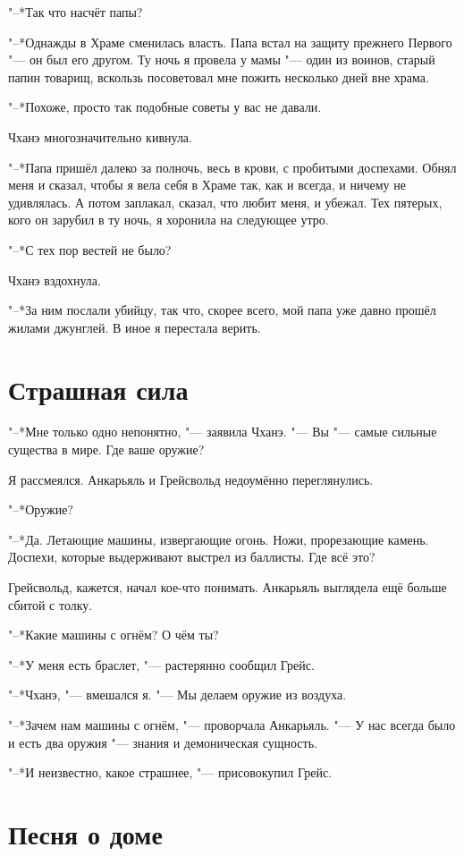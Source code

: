 \documentclass[a4paper,10pt]{book}
\begin{document}
"--*Так что насчёт папы?

"--*Однажды в Храме сменилась власть. Папа встал на защиту прежнего Первого 
"--- он был его другом. Ту ночь я провела у мамы "--- один из воинов, старый 
папин товарищ, вскользь посоветовал мне пожить несколько дней вне храма.

"--*Похоже, просто так подобные советы у вас не давали.

Чханэ многозначительно кивнула.

"--*Папа пришёл далеко за полночь, весь в крови, с пробитыми доспехами. Обнял 
меня и сказал, чтобы я вела себя в Храме так, как и всегда, и ничему не 
удивлялась. А потом заплакал, сказал, что любит меня, и убежал. Тех пятерых, 
кого он зарубил в ту ночь, я хоронила на следующее утро.

"--*С тех пор вестей не было?

Чханэ вздохнула.

"--*За ним послали убийцу, так что, скорее всего, мой папа уже давно прошёл 
жилами джунглей. В иное я перестала верить.

\section{Страшная сила}

"--*Мне только одно непонятно, "--- заявила Чханэ. "--- Вы "--- самые сильные 
существа в мире. Где ваше оружие?

Я рассмеялся. Анкарьяль и Грейсвольд недоумённо переглянулись.

"--*Оружие?

"--*Да. Летающие машины, извергающие огонь. Ножи, прорезающие камень. Доспехи, 
которые выдерживают выстрел из баллисты. Где всё это?

Грейсвольд, кажется, начал кое-что понимать. Анкарьяль выглядела ещё больше 
сбитой с толку.

"--*Какие машины с огнём? О чём ты?

"--*У меня есть браслет, "--- растерянно сообщил Грейс.

"--*Чханэ, "--- вмешался я. "--- Мы делаем оружие из воздуха.

"--*Зачем нам машины с огнём, "--- проворчала Анкарьяль. "--- У нас всегда было 
и 
есть два оружия "--- знания и демоническая сущность.

"--*И неизвестно, какое страшнее, "--- присовокупил Грейс.

\section{Песня о доме}
\end{document}
